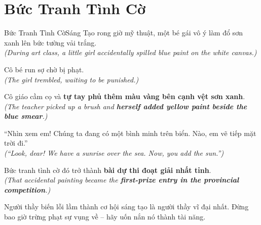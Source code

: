 \section{Bức Tranh Tình Cờ}
\begin{truyen}{Bức Tranh Tình Cờ}{Sáng Tạo}
rong giờ mỹ thuật, một bé gái vô ý làm đổ sơn xanh lên bức tường vải trắng.\\
\textit{(During art class, a little girl accidentally spilled blue paint on the white canvas.)}

Cô bé run sợ chờ bị phạt.\\
\textit{(The girl trembled, waiting to be punished.)}

Cô giáo cầm cọ và \textbf{tự tay phủ thêm màu vàng bên cạnh vệt sơn xanh}.\\
\textit{(The teacher picked up a brush and \textbf{herself added yellow paint beside the blue smear}.)}

``Nhìn xem em! Chúng ta đang có một bình minh trên biển. Nào, em vẽ tiếp mặt trời đi.''\\
\textit{(``Look, dear! We have a sunrise over the sea. Now, you add the sun.'')}

Bức tranh tình cờ đó trở thành \textbf{bài dự thi đoạt giải nhất tỉnh}.\\
\textit{(That accidental painting became the \textbf{first-prize entry in the provincial competition}.)}
\end{truyen}
\begin{baihoc}
  Người thầy biến lỗi lầm thành cơ hội sáng tạo là người thầy vĩ đại nhất. Đừng bao giờ trừng phạt sự vụng về – hãy uốn nắn nó thành tài năng.
\end{baihoc}

